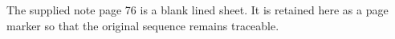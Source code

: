 \vspace{20mm}
The supplied note page 76 is a blank lined sheet. It is retained here as
a page marker so that the original sequence remains traceable.
